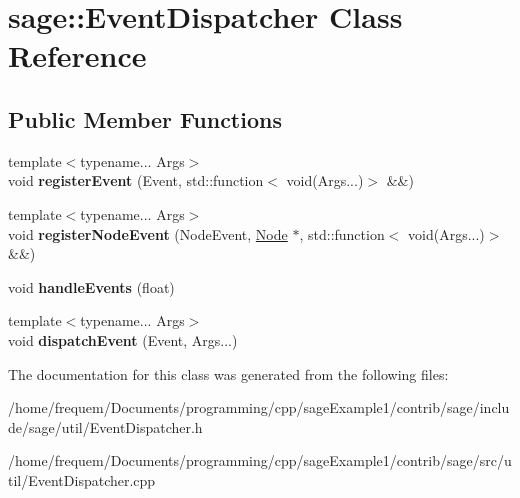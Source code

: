 \hypertarget{classsage_1_1EventDispatcher}{}\section{sage\+::Event\+Dispatcher Class Reference}
\label{classsage_1_1EventDispatcher}
\subsection*{Public Member Functions}
\begin{DoxyCompactItemize}
\item 
\mbox{\label{classsage_1_1EventDispatcher_a3f39344480bd225eaa2dea910aa2adcd}} 
{\footnotesize template$<$typename... Args$>$ }\\void {\bfseries register\+Event} (Event, std\+::function$<$ void(Args...)$>$ \&\&)
\item 
\mbox{\label{classsage_1_1EventDispatcher_afeb49fee73912bd62465142c56324349}} 
{\footnotesize template$<$typename... Args$>$ }\\void {\bfseries register\+Node\+Event} (Node\+Event, \mbox{\hyperlink{classsage_1_1Node}{Node}} $\ast$, std\+::function$<$ void(Args...)$>$ \&\&)
\item 
\mbox{\label{classsage_1_1EventDispatcher_a1d3c52b39f626d24e599617c43bfd6fc}} 
void {\bfseries handle\+Events} (float)
\item 
\mbox{\label{classsage_1_1EventDispatcher_a92f3dc7eb0560ad2367b7060868b4395}} 
{\footnotesize template$<$typename... Args$>$ }\\void {\bfseries dispatch\+Event} (Event, Args...)
\end{DoxyCompactItemize}


The documentation for this class was generated from the following files\+:\begin{DoxyCompactItemize}
\item 
/home/frequem/\+Documents/programming/cpp/sage\+Example1/contrib/sage/include/sage/util/Event\+Dispatcher.\+h\item 
/home/frequem/\+Documents/programming/cpp/sage\+Example1/contrib/sage/src/util/Event\+Dispatcher.\+cpp\end{DoxyCompactItemize}
